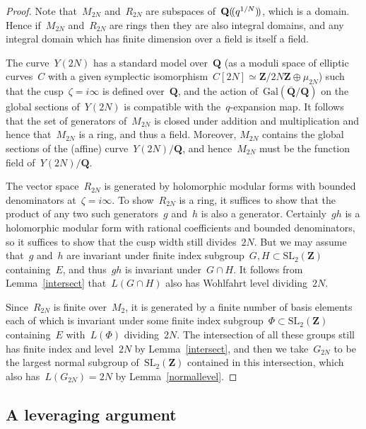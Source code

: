 \documentclass[10pt]{amsart}
\def\llp{(\kern-0.15em{(}}
\def\rrp{)\kern-0.15em{)}}
\def\Z{\mathbf{Z}}
\def\Q{\mathbf{Q}}
\def\Qbar{\overline{\Q}}
\theoremstyle{remark}
\numberwithin{equation}{subsection}
\def\Gal{\mathrm{Gal}}
\def\SL{\mathrm{SL}}
\begin{document}
\begin{proof} 
Note that~$M_{2N}$ and~$R_{2N}$ are subspaces of~$\Q \llp q^{1/N} \rrp$, which is a domain.
Hence if~$M_{2N}$ and~$R_{2N}$ are rings then they are also integral domains, and any integral  domain which has finite dimension over a field is itself a field.

The curve~$Y(2N)$ has a standard model over~$\Q$ (as a moduli space of elliptic curves~$C$ with a given symplectic isomorphism~$C[2N] \simeq \Z/2N\Z \oplus \mu_{2N}$)
such that the cusp~$\zeta = i  \infty$ is  defined over~$\Q$, and the action of~$\Gal(\Qbar/\Q)$ on the global sections of~$Y(2N)$
is compatible with the~$q$-expansion map.  It follows that the set of generators of~$M_{2N}$ is closed under addition and multiplication and hence that~$M_{2N}$
is a ring, and thus a field. Moreover, $M_{2N}$ contains the global sections of the (affine) curve~$Y(2N)/\Q$, and hence~$M_{2N}$
must be the function field of~$Y(2N)/\Q$.



The vector space~$R_{2N}$ is generated by holomorphic modular forms with bounded denominators at~$\zeta = i \infty$. To show~$R_{2N}$ is a ring, it suffices to show that the
product of any two such generators~$g$ and~$h$ is also a generator. Certainly~$gh$ is a holomorphic modular form  with rational coefficients and  bounded denominators, so it suffices to show that the cusp width still divides~$2N$.
But we may assume that~$g$ and~$h$ are invariant under finite index subgroup~$G,H \subset \SL_2(\Z)$ containing~$E$,
and thus~$gh$ is invariant under~$G \cap H$. 
It follows from Lemma~\ref{intersect} that~$L(G \cap H)$ also has  Wohlfahrt level dividing~$2N$.

Since~$R_{2N}$ is finite over~$M_2$, it is generated by a finite number of  basis elements each of which is invariant under some finite index subgroup~$\Phi \subset \SL_2(\Z)$ containing~$E$ with~$L(\Phi)$ dividing~$2N$.
The intersection of all these groups still has finite index and level~$2N$ by Lemma~\ref{intersect},
and then we take~$G_{2N}$ to be the largest normal subgroup of~$\SL_2(\Z)$ contained in this intersection, which also has~$L(G_{2N})=2N$
by Lemma~\ref{normallevel}.
\end{proof}







\subsection{A leveraging argument}
\label{leveraging}
\end{document}

